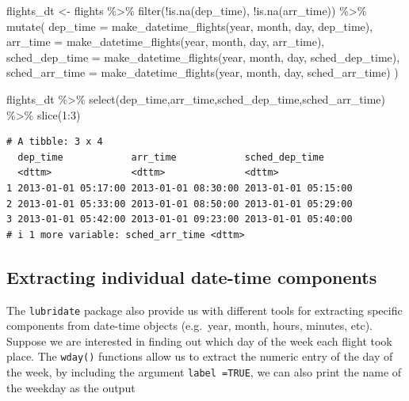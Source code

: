 \documentclass[
  letterpaper,
  DIV=11,
  numbers=noendperiod]{scrartcl}
\newenvironment{Shaded}{\begin{snugshade}}{\end{snugshade}}
\newcommand{\AttributeTok}[1]{\textcolor[rgb]{0.40,0.45,0.13}{#1}}
\newcommand{\DecValTok}[1]{\textcolor[rgb]{0.68,0.00,0.00}{#1}}
\newcommand{\FunctionTok}[1]{\textcolor[rgb]{0.28,0.35,0.67}{#1}}
\newcommand{\NormalTok}[1]{\textcolor[rgb]{0.00,0.23,0.31}{#1}}
\newcommand{\OtherTok}[1]{\textcolor[rgb]{0.00,0.23,0.31}{#1}}
\newcommand{\SpecialCharTok}[1]{\textcolor[rgb]{0.37,0.37,0.37}{#1}}
\begin{document}
\begin{Shaded}
\begin{Highlighting}[]
\NormalTok{flights\_dt }\OtherTok{\textless{}{-}}\NormalTok{ flights }\SpecialCharTok{\%\textgreater{}\%}
  \FunctionTok{filter}\NormalTok{(}\SpecialCharTok{!}\FunctionTok{is.na}\NormalTok{(dep\_time), }\SpecialCharTok{!}\FunctionTok{is.na}\NormalTok{(arr\_time)) }\SpecialCharTok{\%\textgreater{}\%}
  \FunctionTok{mutate}\NormalTok{(}
    \AttributeTok{dep\_time =} \FunctionTok{make\_datetime\_flights}\NormalTok{(year, month, day, dep\_time),}
    \AttributeTok{arr\_time =} \FunctionTok{make\_datetime\_flights}\NormalTok{(year, month, day, arr\_time),}
    \AttributeTok{sched\_dep\_time =} \FunctionTok{make\_datetime\_flights}\NormalTok{(year, month, day, sched\_dep\_time),}
    \AttributeTok{sched\_arr\_time =} \FunctionTok{make\_datetime\_flights}\NormalTok{(year, month, day, sched\_arr\_time)}
\NormalTok{  )}

\NormalTok{flights\_dt }\SpecialCharTok{\%\textgreater{}\%}
  \FunctionTok{select}\NormalTok{(dep\_time,arr\_time,sched\_dep\_time,sched\_arr\_time) }\SpecialCharTok{\%\textgreater{}\%}
  \FunctionTok{slice}\NormalTok{(}\DecValTok{1}\SpecialCharTok{:}\DecValTok{3}\NormalTok{)}
\end{Highlighting}
\end{Shaded}

\begin{verbatim}
# A tibble: 3 x 4
  dep_time            arr_time            sched_dep_time     
  <dttm>              <dttm>              <dttm>             
1 2013-01-01 05:17:00 2013-01-01 08:30:00 2013-01-01 05:15:00
2 2013-01-01 05:33:00 2013-01-01 08:50:00 2013-01-01 05:29:00
3 2013-01-01 05:42:00 2013-01-01 09:23:00 2013-01-01 05:40:00
# i 1 more variable: sched_arr_time <dttm>
\end{verbatim}

\subsection{Extracting individual date-time
components}\label{extracting-individual-date-time-components}

The \texttt{lubridate} package also provide us with different tools for
extracting specific components from date-time objects (e.g.~year, month,
hours, minutes, etc). Suppose we are interested in finding out which day
of the week each flight took place. The \texttt{wday()} functions allow
us to extract the numeric entry of the day of the week, by including the
argument \texttt{label\ =TRUE}, we can also print the name of the
weekday as the output
\end{document}

